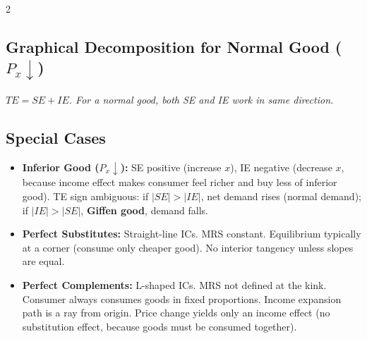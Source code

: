 \documentclass[10pt,a4paper]{article}
\begin{document}
\begin{multicols}{2}
\subsection*{Graphical Decomposition for Normal Good ($P_x \downarrow$)}
\begin{center}
\end{center}
\textit{$TE = SE + IE$. For a normal good, both SE and IE work in same direction.}

\subsection*{Special Cases}
\begin{itemize}[leftmargin=*,nosep]
    \item \textbf{Inferior Good ($P_x \downarrow$):} SE positive (increase $x$), IE negative (decrease $x$, because income effect makes consumer feel richer and buy less of inferior good). TE sign ambiguous: if $|SE| > |IE|$, net demand rises (normal demand); if $|IE| > |SE|$, \textbf{Giffen good}, demand falls.
    \item \textbf{Perfect Substitutes:} Straight-line ICs. MRS constant. Equilibrium typically at a corner (consume only cheaper good). No interior tangency unless slopes are equal.
    \item \textbf{Perfect Complements:} L-shaped ICs. MRS not defined at the kink. Consumer always consumes goods in fixed proportions. Income expansion path is a ray from origin. Price change yields only an income effect (no substitution effect, because goods must be consumed together).
\end{itemize}


\end{multicols}
\end{document}
